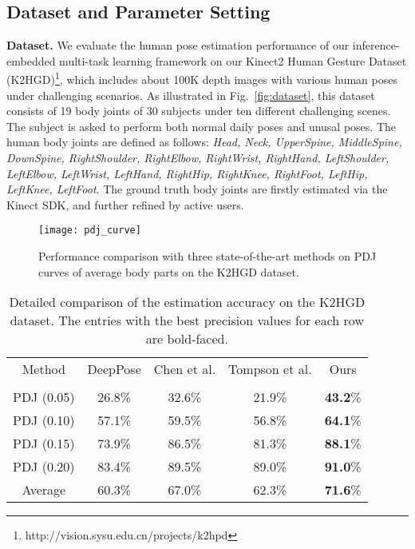 \documentclass{sig-alternate-05-2015}
\begin{document}
\subsection{Dataset and Parameter Setting}
\textbf{Dataset.}
We evaluate the human pose estimation performance of our inference-embedded multi-task learning framework on our Kinect2 Human Gesture Dataset (K2HGD)\footnote{http://vision.sysu.edu.cn/projects/k2hpd}, which includes about 100K depth images with various human poses under challenging scenarios. As illustrated in Fig.~\ref{fig:dataset}, this dataset consists of 19 body joints of 30 subjects under ten different challenging scenes. The subject is asked to perform both normal daily poses and unusal poses. The human body joints are defined as follows: \emph{Head, Neck, UpperSpine, MiddleSpine, DownSpine, RightShoulder, RightElbow, RightWrist, RightHand, LeftShoulder, LeftElbow, LeftWrist, LeftHand, RightHip, RightKnee, RightFoot, LeftHip, LeftKnee, LeftFoot}. The ground truth body joints are firstly estimated via the Kinect SDK, and further refined by active users. 

\begin{figure}[t]
\centering
\texttt{[image: pdj\_curve]}
\caption{Performance comparison with three state-of-the-art methods on PDJ curves of average body parts on the K2HGD dataset.}\label{fig:method}
\end{figure}

\begin{table}[t]
\scriptsize
\center
\setlength{\tabcolsep}{2.5pt}
\begin{tabular}{|c|c|c|c|c|}
\hline
\hline
Method & DeepPose & Chen et al. & Tompson et al. & Ours  \\
& \cite{dp14cvpr} &\cite{idpr14nips}&\cite{cn15cvpr} & \\
\hline
PDJ (0.05) & 26.8\% & 32.6\% & 21.9\% & \textbf{43.2}\% \\
PDJ (0.10) & 57.1\% & 59.5\% & 56.8\% & \textbf{64.1}\% \\
PDJ (0.15) & 73.9\% & 86.5\% & 81.3\% & \textbf{88.1}\% \\
PDJ (0.20) & 83.4\% & 89.5\% & 89.0\% & \textbf{91.0}\% \\
\hline
Average & 60.3\% & 67.0\% & 62.3\% & \textbf{71.6}\% \\
\hline
\hline
\end{tabular}
\vspace{1pt}
\caption{Detailed comparison of the estimation accuracy on the K2HGD dataset. The entries with the best precision values for each row are bold-faced.}\label{tab:detailed}
\end{table}
\end{document}

